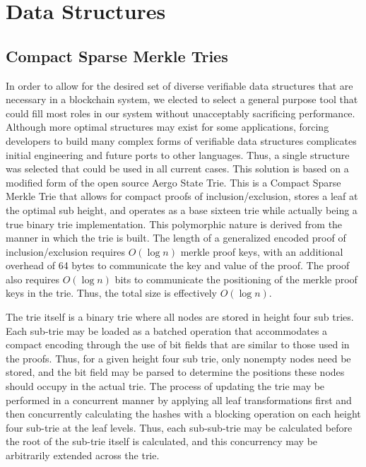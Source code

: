 \section{Data Structures}

\subsection{Compact Sparse Merkle Tries}

In order to allow for the desired set of diverse verifiable data
structures that are necessary in a blockchain system, we elected to
select a general purpose tool that could fill most roles in our system
without unacceptably sacrificing performance.
Although more optimal structures may exist for some applications,
forcing developers to build many complex forms of verifiable data
structures complicates initial engineering and future ports to other languages.
Thus, a single structure was selected that could be used in all current cases.
This solution is based on a modified form of the open source Aergo State Trie.
This is a Compact Sparse Merkle Trie that allows for compact proofs of
inclusion/exclusion, stores a leaf at the optimal sub height, and
operates as a base sixteen trie while actually being a true binary trie
implementation.
This polymorphic nature is derived from the manner in which the trie is built.
The length of a generalized encoded proof of inclusion/exclusion
requires $O(\log n)$ merkle proof keys, with an additional overhead of 64
bytes to communicate the key and value of the proof.
The proof also requires $O(\log n)$ bits to communicate the positioning of
the merkle proof keys in the trie.
Thus, the total size is effectively $O(\log n)$.

The trie itself is a binary trie where all nodes are stored in height
four sub tries.
Each sub-trie may be loaded as a batched operation that accommodates a
compact encoding through the use of bit fields that are similar to
those used in the proofs.
Thus, for a given height four sub trie, only nonempty nodes need be
stored, and the bit field may be parsed to determine the positions
these nodes should occupy in the actual trie.
The process of updating the trie may be performed in a concurrent
manner by applying all leaf transformations first and then concurrently
calculating the hashes with a blocking operation on each height four
sub-trie at the leaf levels.
Thus, each sub-sub-trie may be calculated before the root of the
sub-trie itself is calculated, and this concurrency may be arbitrarily
extended across the trie.

